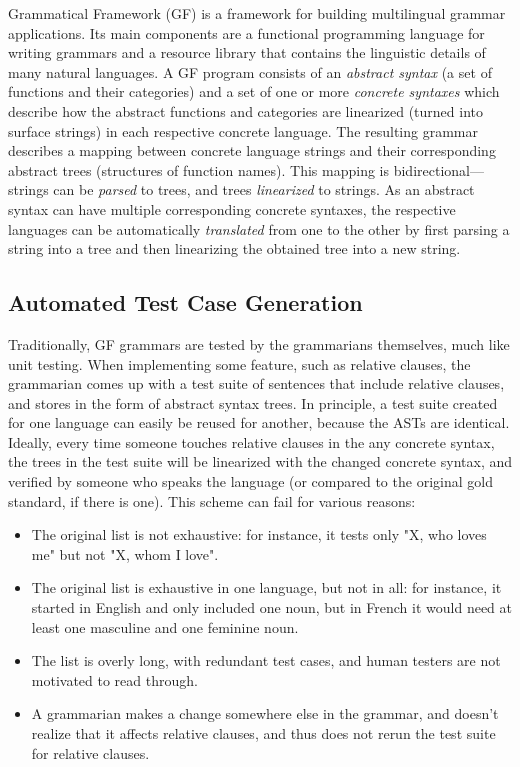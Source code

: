 \documentclass[conference]{IEEEtran}
\begin{document}
Grammatical Framework (GF) \cite{ranta2010gfbook} 
is a framework for building multilingual grammar applications. Its main
components are a functional programming language for writing grammars
and a resource library that contains the linguistic details of many
natural languages.
A GF program consists of an \emph{abstract syntax} (a set of functions
and their categories) and a set of one or more
\emph{concrete syntaxes} which describe how the abstract
functions and categories are linearized (turned into surface strings) in each
respective concrete language. The resulting grammar
describes a mapping between concrete language strings and
their corresponding abstract trees (structures of function names).
This mapping is bidirectional---strings can be \emph{parsed} to
trees, and trees \emph{linearized} to strings.
As an abstract syntax can have multiple corresponding concrete syntaxes,
the respective
languages can be automatically \emph{translated} from one to the other by
first parsing a string into a tree and then linearizing the obtained tree
into a new string.


\subsection{Automated Test Case Generation}

Traditionally, GF grammars are tested by the grammarians themselves,
much like unit testing. %
When implementing some feature, such as relative clauses, the grammarian
comes up with a test suite of sentences that include relative clauses, 
and stores in the form of abstract syntax trees. In principle, a test suite created for one
language can easily be reused for another, because the ASTs are identical.
Ideally, every time someone touches relative clauses in the any concrete syntax, the trees 
in the test suite will be linearized with the changed concrete syntax, and verified by 
someone who speaks the language (or compared to the original gold standard, if there is one).
This scheme can fail for various reasons:

\begin{itemize}
\item The original list is not exhaustive: for instance, it tests only "X, who loves me" but not "X, whom I love".
\item The original list is exhaustive in one language, but not in all: for instance, it started in English and only included one noun, but in French it would need at least one masculine and one feminine noun.
\item The list is overly long, with redundant test cases, and human testers are not motivated to read through.
\item A grammarian makes a change somewhere else in the grammar, and doesn't realize that it affects relative clauses, and thus does not rerun the test suite for relative clauses.
\end{itemize}
\end{document}
